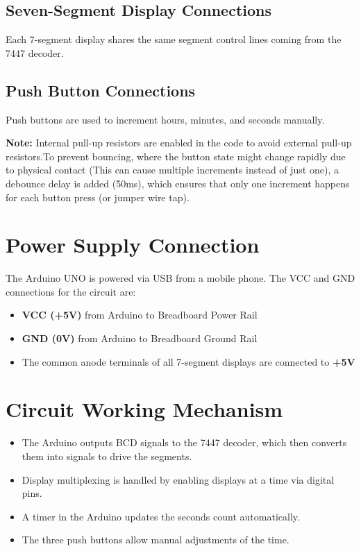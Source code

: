\documentclass[a4paper,12pt]{article}
\theoremstyle{remark}
\begin{document}
\subsection{Seven-Segment Display Connections}
Each 7-segment display shares the same segment control lines coming from the 7447 decoder.




\subsection{Push Button Connections}
Push buttons are used to increment hours, minutes, and seconds manually.




\textbf{Note:} Internal pull-up resistors are enabled in the code to avoid external pull-up resistors.To prevent bouncing, where the button
state might change rapidly due to physical contact (This can cause multiple increments instead of just one), a debounce delay is added (50ms), which ensures that only one increment happens for each button press (or jumper wire tap).

\section{Power Supply Connection}
The Arduino UNO is powered via USB from a mobile phone. The VCC and GND connections for the circuit are:
\begin{itemize}
    \item \textbf{VCC (+5V)} from Arduino to Breadboard Power Rail
    \item \textbf{GND (0V)} from Arduino to Breadboard Ground Rail
    \item The common anode terminals of all 7-segment displays are connected to \textbf{+5V}
\end{itemize}

\section{Circuit Working Mechanism}
\begin{itemize}
    \item The Arduino outputs BCD signals to the 7447 decoder, which then converts them into signals to drive the segments.
    \item Display multiplexing is handled by enabling displays at a time via digital pins.
    \item A timer in the Arduino updates the seconds count automatically.
    \item The three push buttons allow manual adjustments of the time.
\end{itemize}
\end{document}
